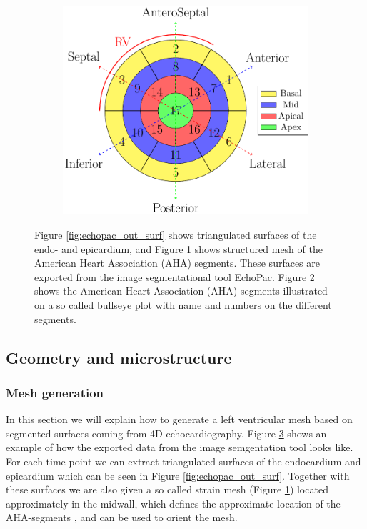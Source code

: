 \begin{figure}[htbp]
\begin{subfigure}[t]{0.3\textwidth}
    \caption{\label{fig:echopac_out_strain_mesh}}
  \end{subfigure}
  \begin{subfigure}[t]{0.38\textwidth}
    \includegraphics[width=\textwidth]{chapters/introduction/figures/bullseye/bullseye.pdf}
    \caption{\label{fig:bullseye_intro}}
  \end{subfigure}
\caption{Figure \ref{fig:echopac_out_surf} shows triangulated surfaces of the
      endo- and epicardium, and Figure
      \ref{fig:echopac_out_strain_mesh} shows structured mesh of the
      American Heart Association (AHA) segments. These surfaces are
      exported from the image segmentational tool EchoPac. Figure 
      \ref{fig:bullseye_intro} shows the American Heart Association (AHA)
      segments illustrated on a so called bullseye plot with name and
      numbers on the different segments. }
\label{fig:echopac_output}
\end{figure}


\subsection{Geometry and microstructure}


\subsubsection{Mesh generation}
In this section we will explain how to generate a left ventricular
mesh based on segmented surfaces coming from 4D echocardiography.
Figure \ref{fig:echopac_output} shows an example of how the exported data
from the image semgentation tool looks like. For each time point we
can extract triangulated surfaces of the endocardium and epicardium
which can be seen in Figure \ref{fig:echopac_out_surf}. Together with
these surfaces we are also given a so called strain mesh (Figure
\ref{fig:echopac_out_strain_mesh}) located approximately in the
midwall, which defines the approximate location of the AHA-segments
\cite{cerqueira2002standardized}, and can be used to orient the mesh. 



